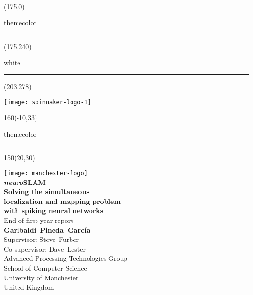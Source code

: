 \setlength{\TPHorizModule}{1mm}
\setlength{\TPVertModule}{1mm}
  ~
  \begin{textblock}{50}(175,0)
    \begin{color}{themecolor}
      \rule{3cm}{30cm}
    \end{color}
  \end{textblock}
  
  \begin{textblock}{50}(175,240)
    \begin{color}{white}
      \rule{32mm}{40mm}
    \end{color}
  \end{textblock}
  
  \begin{textblock}{20}(203,278)
    \begin{rotate}{90}
      \texttt{[image: spinnaker-logo-1]}
    \end{rotate}
  \end{textblock}
  
  \begin{textblock}{160}(-10,33)
    \begin{color}{themecolor}
      \rule{18.4cm}{2.2cm}
    \end{color}
  \end{textblock}


  
  \begin{textblock}{150}(20,30)
    \begin{flushright}
    \texttt{[image: manchester-logo]}\\[5em]
    
    {\noindent\Huge\bfseries \textsf{\textit{neuro}SLAM}\\ 
      Solving the simultaneous \\
      localization and mapping problem \\[0.3em]
      with spiking neural networks
    }\\[1em]
    
    {\noindent\huge End-of-first-year report }\\[5em]
    
    {\noindent\Large\bfseries Garibaldi~Pineda~García}\\[0.5em]
    {\noindent\Large Supervisor: Steve~Furber}\\[0.1em]
    {\noindent\Large Co-supervisor: Dave~Lester}\\[1em]
    {\noindent\large Advanced Processing Technologies Group\\
      School of Computer Science \\
      University of Manchester\\[0.4em]
      United Kingdom}
    \end{flushright}
  \end{textblock}

